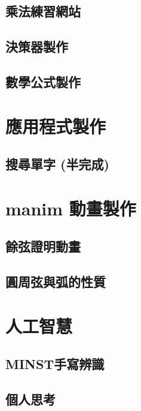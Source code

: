\documentclass[12pt]{ctexart}
\begin{document}
\subsection{ 乘法練習網站 }
\clearpage
\subsection{ 決策器製作 }
\clearpage
\subsection{ 數學公式製作 }

\clearpage
\section{ 應用程式製作 }
\label{ sec::app }
\subsection{ 搜尋單字 (半完成) }


\clearpage
\section{ manim 動畫製作 }
\label{ sec::animate }
\subsection{ 餘弦證明動畫 }
\clearpage
\subsection{ 圓周弦與弧的性質 }



\clearpage
\section{ 人工智慧 }
\label{ sec::AI }
\subsection{ MINST手寫辨識 }
\clearpage
\subsection{ 個人思考 }
\end{document}

